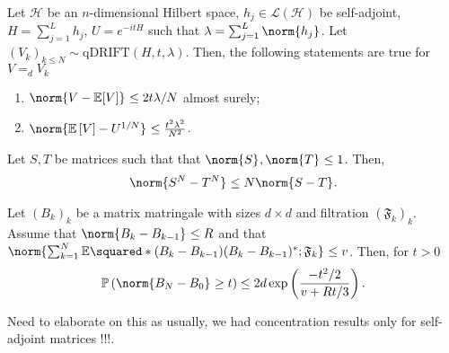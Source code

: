 \begin{lem}[]
  \label{qdriftnorm}
    Let \( \mathcal{H} \) be an \( n \)-dimensional Hilbert space, \( h_j \in \mathcal{L}(\mathcal{H}) \) be self-adjoint, \( H=\sum_{j=1}^{L}h_j \), \( U=e^{-itH} \) such that \( \lambda= \sum_{j=1}^{L} \norm{h_j}_{} \). Let \( (V_k)_{k \leq N} \sim \text{qDRIFT}(H,t, \lambda) \). Then, the following statements are true for \( V =_d V_k \)
    \begin{enumerate}[1)]
      \item \( \norm{V-\mathbb{E}[V]}_{} \leq 2t\lambda/N \) almost surely;
      \item \( \norm{\mathbb{E}\left[V\right]- U^{1/N}}_{} \leq \frac{t^{2}\lambda^{2}}{N^{2}} \).
    \end{enumerate}
    
\end{lem}

 
\begin{lem}[]
  \label{unitaryN}
      Let \( S,T \) be matrices such that that \( \norm{S}_{}, \norm{T}_{} \leq 1 \). Then,
      \[ \norm{S^{N}-T^{N}}_{} \leq N \norm{S-T}_{}. \]
\end{lem}
  

\begin{thm}
  \label{matrixbernstein}
    Let \( (B_k)_k \) be a matrix matringale with sizes \( d \times d \) and filtration \( (\mathfrak{F}_k)_k \). Assume that \( \norm{B_k-B_{k-1}}_{} \leq R \) and that \( \norm{\sum_{k=1}^{N} \mathbb{E}\squared*{(B_k-B_{k-1})(B_k-B_{k-1})^{*};\mathfrak{F}_k}}_{} \leq v \). Then, for \( t >0 \)
    \[ \mathbb{P}\left(\norm{B_N-B_0}_{} \geq t\right) \leq 2d \operatorname{exp}\left(\frac{-t^{2}/2}{v+Rt/3}\right).\]
\end{thm}
Need to elaborate on this as usually, we had concentration results only for self-adjoint matrices !!!.


